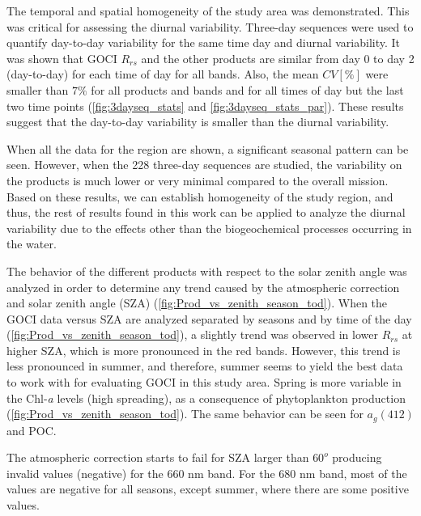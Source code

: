 \documentclass[onecolumn,3p,letterpaper,11pt]{elsarticle}
\begin{document}
The temporal and spatial homogeneity of the study area was demonstrated. 
This was critical for assessing the diurnal variability. 
Three-day sequences were used to quantify day-to-day variability for the same time day and diurnal variability. It was shown that GOCI $R_{rs}$ and the other products are similar from day 0 to day 2 (day-to-day) for each time of day for all bands. 
Also, the mean $CV[\%]$ were smaller than $7\%$ for all products and bands and for all times of day but the last two time points (\autoref{fig:3dayseq_stats} and \autoref{fig:3dayseq_stats_par}). 
These results suggest that the day-to-day variability is smaller than the diurnal variability. 

When all the data for the region are shown, a significant seasonal pattern can be seen. 
However, when the 228 three-day sequences are studied, the variability on the products is much lower or very minimal compared to the overall mission. 
Based on these results, we can establish homogeneity of the study region, and thus, the rest of results found in this work can be applied to analyze the diurnal variability due to the effects other than the biogeochemical processes occurring in the water.

The behavior of the different products with respect to the solar zenith angle was analyzed in order to determine any trend caused by the atmospheric correction and solar zenith angle (SZA) (\autoref{fig:Prod_vs_zenith_season_tod}).
When the GOCI data versus SZA are analyzed separated by seasons and by time of the day (\autoref{fig:Prod_vs_zenith_season_tod}), a slightly trend was observed in lower $R_{rs}$ at higher SZA, which is more pronounced in the red bands. 
However, this trend is less pronounced in summer, and therefore, summer seems to yield the best data to work with for evaluating GOCI in this study area.
Spring is more variable in the Chl-{\it a} levels (high spreading), as a consequence of phytoplankton production (\autoref{fig:Prod_vs_zenith_season_tod}). 
The same behavior can be seen for $a_g(412)$ and POC. 

The atmospheric correction starts to fail for SZA larger than $60^o$ producing invalid values (negative) for the 660 nm band.
For the 680 nm band, most of the values are negative for all seasons, except summer, where there are some positive values.
\end{document}
